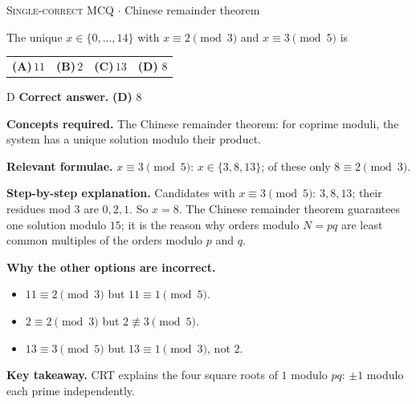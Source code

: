 \documentclass[11pt,a4paper]{article}
\newcommand{\optlabel}[1]{\textbf{(#1)}}
\newcommand{\correctlabel}[1]{\textcolor{okgreen}{\textbf{(#1)}\,\ding{51}}}
\newenvironment{qitem}[1]{\begin{list}{}{\setlength{\leftmargin}{3.3em}\setlength{\labelwidth}{3.1em}%
  \setlength{\labelsep}{0.2em}\setlength{\topsep}{3pt}\setlength{\parsep}{3pt}}\item[\textbf{Q.#1}\hfill]}{\end{list}}
\newcommand{\qsep}{\par\vspace{2pt}{\color{black!15}\hrule}\vspace{4pt}}
\newcommand{\qmeta}[2]{{\footnotesize\color{black!60}\textsc{#1} \;$\cdot$\; #2}\par}
\begin{document}
\begin{qitem}{9}
\qmeta{Single-correct MCQ}{Chinese remainder theorem}
The unique $x \in \{0, \dots, 14\}$ with $x \equiv 2 \pmod 3$ and $x \equiv 3 \pmod 5$ is
\par\smallskip\noindent\begin{tabularx}{\linewidth}{@{}*{4}{L}@{}}
\optlabel{A}\,$11$ & \optlabel{B}\,$2$ & \optlabel{C}\,$13$ & \correctlabel{D}\,$8$
\end{tabularx}
\end{qitem}
\begin{solbox}{D}
\textbf{\color{brand}Correct answer.} \textcolor{okgreen}{\textbf{(D)}} $8$

\textbf{\color{brand}Concepts required.} The Chinese remainder theorem: for coprime moduli, the system has a unique solution modulo their product.

\textbf{\color{brand}Relevant formulae.} $x \equiv 3 \pmod 5$: $x \in \{3, 8, 13\}$; of these only $8 \equiv 2 \pmod 3$.

\textbf{\color{brand}Step-by-step explanation.} Candidates with $x \equiv 3 \pmod 5$: $3, 8, 13$; their residues mod 3 are $0, 2, 1$. So $x = 8$. The Chinese remainder theorem guarantees one solution
modulo $15$; it is the reason why orders modulo $N = pq$ are least common multiples of the orders modulo $p$ and $q$.

\textbf{\color{brand}Why the other options are incorrect.}
\begin{itemize}[leftmargin=2.4em, itemsep=1pt, topsep=2pt]
\item[\textbf{(A)}] $11 \equiv 2 \pmod 3$ but $11 \equiv 1 \pmod 5$.
\item[\textbf{(B)}] $2 \equiv 2 \pmod 3$ but $2 \not\equiv 3 \pmod 5$.
\item[\textbf{(C)}] $13 \equiv 3 \pmod 5$ but $13 \equiv 1 \pmod 3$, not $2$.
\end{itemize}
\textbf{\color{brand}Key takeaway.} CRT explains the four square roots of $1$ modulo $pq$: $\pm1$ modulo each prime independently.
\end{solbox}
\qsep
\end{document}
